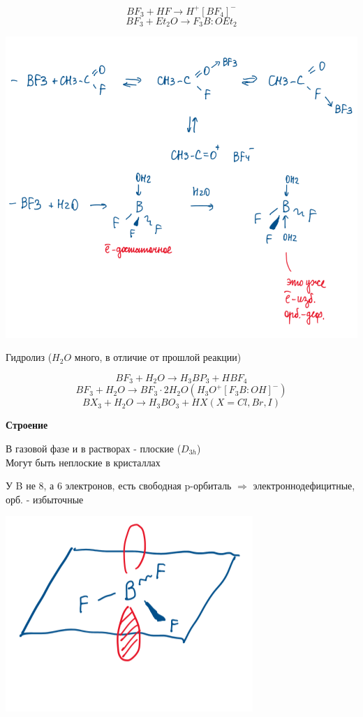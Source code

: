 $$BF_3 + HF \rightarrow H^+[BF_4]^-$$
$$BF_3 + Et_2O \rightarrow F_3B:OEt_2$$

\includegraphics{images/11v8.png}

Гидролиз ($H_2O$ много, в отличие от прошлой реакции)

$$BF_3 + H_2O \rightarrow H_3BP_3 + HBF_4$$
$$BF_3 + H_2O \rightarrow BF_3\cdot 2H_2O (H_3O^+[F_3B:OH]^-)$$
$$BX_3 + H_2O \rightarrow H_3BO_3 + HX (X=Cl,Br,I)$$

\textbf{Строение}

В газовой фазе и в растворах - плоские ($D_{3h}$)\\
Могут быть неплоские в кристаллах

У B не 8, а 6 электронов, есть свободная p-орбиталь $\Rightarrow$ электроннодефицитные, орб. - избыточные

\includegraphics{images/11v9.png}

